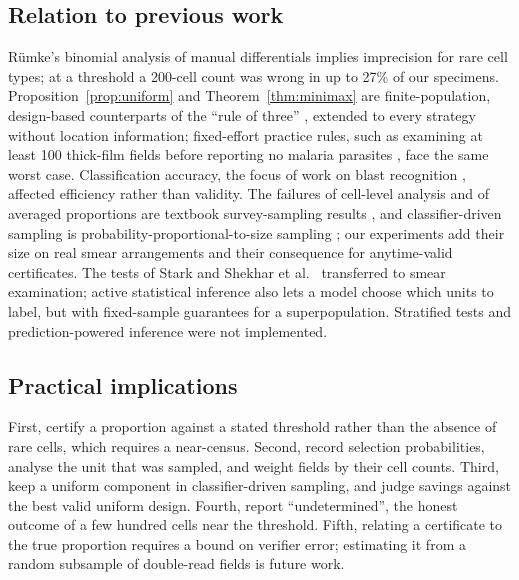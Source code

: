 \documentclass[preprint,12pt]{elsarticle}
\theoremstyle{remark}
\theoremstyle{definition}
\begin{document}
\subsection{Relation to previous work}
R\"umke's binomial analysis of manual differentials \cite{rumke1978} implies imprecision for rare cell types; at a threshold a 200-cell count was wrong in up to 27\% of our specimens. Proposition~\ref{prop:uniform} and Theorem~\ref{thm:minimax} are finite-population, design-based counterparts of the ``rule of three'' \cite{hanley1983}, extended to every strategy without location information; fixed-effort practice rules, such as examining at least 100 thick-film fields before reporting no malaria parasites \cite{who2016malariasop}, face the same worst case. Classification accuracy, the focus of work on blast recognition \cite{matek2019aml}, affected efficiency rather than validity. The failures of cell-level analysis and of averaged proportions are textbook survey-sampling results \cite{kish1965,cochran1977}, and classifier-driven sampling is probability-proportional-to-size sampling \cite{hansen1943,horvitz1952}; our experiments add their size on real smear arrangements and their consequence for anytime-valid certificates. The tests of Stark \cite{stark2023alpha} and Shekhar et al.\ \cite{shekhar2023rlfa} transferred to smear examination; active statistical inference \cite{zrnic2024active} also lets a model choose which units to label, but with fixed-sample guarantees for a superpopulation. Stratified tests \cite{spertus2024stratified} and prediction-powered inference \cite{angelopoulos2023ppi,csillag2025ppe} were not implemented.

\subsection{Practical implications}
First, certify a proportion against a stated threshold rather than the absence of rare cells, which requires a near-census. Second, record selection probabilities, analyse the unit that was sampled, and weight fields by their cell counts. Third, keep a uniform component in classifier-driven sampling, and judge savings against the best valid uniform design. Fourth, report ``undetermined'', the honest outcome of a few hundred cells near the threshold. Fifth, relating a certificate to the true proportion requires a bound on verifier error; estimating it from a random subsample of double-read fields is future work.
\end{document}
